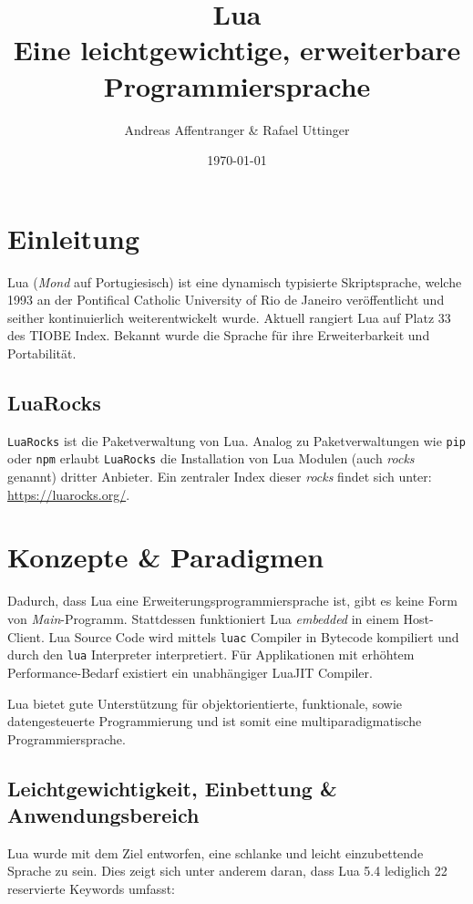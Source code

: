 \documentclass[11pt,a4paper]{article}
\title{Lua \\ [0.2em]\large Eine leichtgewichtige, erweiterbare Programmiersprache}
\author{Andreas Affentranger \& Rafael Uttinger}
\date{\today}
\begin{document}
\maketitle

\section*{Einleitung}

Lua (\textit{Mond} auf Portugiesisch) ist eine dynamisch typisierte Skriptsprache, welche 1993 an der Pontifical Catholic University of Rio de Janeiro veröffentlicht und seither kontinuierlich weiterentwickelt wurde. Aktuell rangiert Lua auf Platz 33 des TIOBE Index. Bekannt wurde die Sprache für ihre Erweiterbarkeit und Portabilität.

\subsection*{LuaRocks}

\texttt{LuaRocks} ist die Paketverwaltung von Lua. 
Analog zu Paketverwaltungen wie \texttt{pip} oder \texttt{npm} erlaubt \texttt{LuaRocks} die Installation von Lua Modulen (auch \textit{rocks} genannt) dritter Anbieter. 
Ein zentraler Index dieser \textit{rocks} findet sich unter: \url{https://luarocks.org/}.

\section*{Konzepte \& Paradigmen}

Dadurch, dass Lua eine Erweiterungsprogrammiersprache ist, gibt es keine Form von \textit{Main}-Programm. Stattdessen funktioniert Lua \textit{embedded} in einem Host-Client.
Lua Source Code wird mittels \texttt{luac} Compiler in Bytecode kompiliert und durch den \texttt{lua} Interpreter interpretiert. Für Applikationen mit erhöhtem Performance-Bedarf existiert ein unabhängiger LuaJIT Compiler.

Lua bietet gute Unterstützung für objektorientierte, funktionale, sowie datengesteuerte Programmierung und ist somit eine multiparadigmatische Programmiersprache.

\subsection*{Leichtgewichtigkeit, Einbettung \& Anwendungsbereich}

Lua wurde mit dem Ziel entworfen, eine schlanke und leicht einzubettende Sprache zu sein. Dies zeigt sich unter anderem daran, dass Lua 5.4 lediglich 22 reservierte Keywords umfasst:
\end{document}
